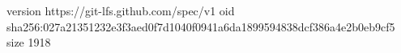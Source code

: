 version https://git-lfs.github.com/spec/v1
oid sha256:027a21351232e3f3aed0f7d1040f0941a6da1899594838dcf386a4e2b0eb9cf5
size 1918

